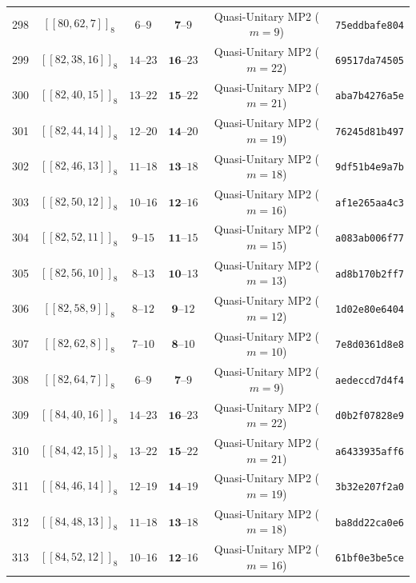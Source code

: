 \documentclass[11pt,a4paper]{article}
\theoremstyle{remark}
\begin{document}
{\begin{longtable}{@{}rccccl@{}}
298 & $[[80,62,7]]_{8}$ & $6\text{--}9$ & $\mathbf{7}\text{--}9$ & Quasi-Unitary MP2 ($m=9$) & \texttt{75eddbafe804} \\
299 & $[[82,38,16]]_{8}$ & $14\text{--}23$ & $\mathbf{16}\text{--}23$ & Quasi-Unitary MP2 ($m=22$) & \texttt{69517da74505} \\
300 & $[[82,40,15]]_{8}$ & $13\text{--}22$ & $\mathbf{15}\text{--}22$ & Quasi-Unitary MP2 ($m=21$) & \texttt{aba7b4276a5e} \\
301 & $[[82,44,14]]_{8}$ & $12\text{--}20$ & $\mathbf{14}\text{--}20$ & Quasi-Unitary MP2 ($m=19$) & \texttt{76245d81b497} \\
302 & $[[82,46,13]]_{8}$ & $11\text{--}18$ & $\mathbf{13}\text{--}18$ & Quasi-Unitary MP2 ($m=18$) & \texttt{9df51b4e9a7b} \\
303 & $[[82,50,12]]_{8}$ & $10\text{--}16$ & $\mathbf{12}\text{--}16$ & Quasi-Unitary MP2 ($m=16$) & \texttt{af1e265aa4c3} \\
304 & $[[82,52,11]]_{8}$ & $9\text{--}15$ & $\mathbf{11}\text{--}15$ & Quasi-Unitary MP2 ($m=15$) & \texttt{a083ab006f77} \\
305 & $[[82,56,10]]_{8}$ & $8\text{--}13$ & $\mathbf{10}\text{--}13$ & Quasi-Unitary MP2 ($m=13$) & \texttt{ad8b170b2ff7} \\
306 & $[[82,58,9]]_{8}$ & $8\text{--}12$ & $\mathbf{9}\text{--}12$ & Quasi-Unitary MP2 ($m=12$) & \texttt{1d02e80e6404} \\
307 & $[[82,62,8]]_{8}$ & $7\text{--}10$ & $\mathbf{8}\text{--}10$ & Quasi-Unitary MP2 ($m=10$) & \texttt{7e8d0361d8e8} \\
308 & $[[82,64,7]]_{8}$ & $6\text{--}9$ & $\mathbf{7}\text{--}9$ & Quasi-Unitary MP2 ($m=9$) & \texttt{aedeccd7d4f4} \\
309 & $[[84,40,16]]_{8}$ & $14\text{--}23$ & $\mathbf{16}\text{--}23$ & Quasi-Unitary MP2 ($m=22$) & \texttt{d0b2f07828e9} \\
310 & $[[84,42,15]]_{8}$ & $13\text{--}22$ & $\mathbf{15}\text{--}22$ & Quasi-Unitary MP2 ($m=21$) & \texttt{a6433935aff6} \\
311 & $[[84,46,14]]_{8}$ & $12\text{--}19$ & $\mathbf{14}\text{--}19$ & Quasi-Unitary MP2 ($m=19$) & \texttt{3b32e207f2a0} \\
312 & $[[84,48,13]]_{8}$ & $11\text{--}18$ & $\mathbf{13}\text{--}18$ & Quasi-Unitary MP2 ($m=18$) & \texttt{ba8dd22ca0e6} \\
313 & $[[84,52,12]]_{8}$ & $10\text{--}16$ & $\mathbf{12}\text{--}16$ & Quasi-Unitary MP2 ($m=16$) & \texttt{61bf0e3be5ce} \\

\end{longtable}}
\end{document}
